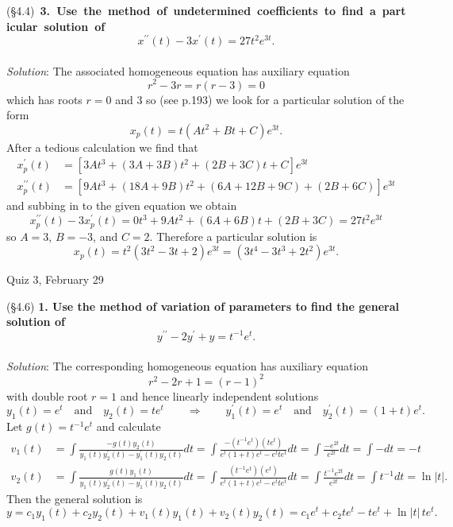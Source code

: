\documentclass[12pt]{article}
\begin{document}
\pagebreak
\noindent
\mbox{(\S 4.4) \textbf{3. Use the method of undetermined coefficients to find a particular solution of}}
$$x^{\prime\prime}(t) - 3x^\prime(t) = 27t^2e^{3t}.$$
~\\
\emph{Solution}: The associated homogeneous equation has auxiliary equation
$$r^2 - 3r = r(r-3) = 0$$
which has roots $r=0$ and $3$ so (see p.193) we look for a particular solution of the form 
$$x_p(t) = t(A t^2 + B t + C)e^{3t}.$$
After a tedious calculation we find that
$$\begin{aligned}
x_p^\prime (t) &= [3At^3 + (3A+3B)t^2 + (2B+3C)t + C]e^{3t} \\
x_p^{\prime\prime} (t) &= [9At^3 + (18A + 9B)t^2 + (6A+12B+9C) + (2B+6C)]e^{3t}
\end{aligned}$$
and subbing in to the given equation we obtain
$$x_p^{\prime\prime} (t) - 3x_p^\prime (t) = 0t^3 + 9At^2 + (6A+6B)t + (2B+3C) = 27t^2e^{3t}$$
so $A=3$, $B = -3$, and $C = 2$.  Therefore a particular solution is
$$x_p(t) = t^2(3t^2 - 3t + 2)e^{3t} = (3t^4 - 3t^3 + 2t^2)e^{3t}.$$
\pagebreak

\begin{center}
{\Large Quiz 3, February 29}
\end{center}
(\S 4.6) \textbf{1. Use the method of variation of parameters to find the general solution of}
$$y^{\prime\prime} - 2 y^\prime + y = t^{-1} e^t.$$
~\\
\emph{Solution}: The corresponding homogeneous equation has auxiliary equation
$$r^2 - 2r + 1 = (r-1)^2$$
with double root $r = 1$ and hence linearly independent solutions
$$y_1(t) = e^t \quad\text{and}\quad y_2(t) = te^t \qquad\Rightarrow\qquad y_1^\prime(t) = e^t \quad\text{and}\quad y_2^\prime(t) = (1+t)e^t.$$
Let $g(t) = t^{-1} e^t$ and calculate
$$\begin{aligned}
v_1(t)	&= \int \frac{-g(t)y_2(t)}{y_1(t)y_2^\prime(t) - y_1^\prime(t) y_2(t)} dt = \int \frac{-(t^{-1} e^t) (t e^t)}{e^t(1+t)e^t - e^t te^t}dt 
		 = \int \frac{-e^{2t}}{e^{2t}} dt = \int -dt = -t \\
v_2(t) 	&= \int \frac{g(t)y_1(t)}{y_1(t)y_2^\prime(t) - y_1^\prime(t) y_2(t)} dt = \int \frac{(t^{-1} e^t) (e^t)}{e^t(1+t)e^t - e^t te^t}dt 
		 = \int \frac{t^{-1} e^{2t}}{e^{2t}} dt = \int t^{-1} dt = \ln |t|.
\end{aligned}$$
Then the general solution is
$$y = c_1 y_1(t) + c_2 y_2(t) + v_1(t) y_1(t) + v_2(t) y_2(t) = c_1 e^t + c_2 t e^t - t e^t + \ln |t| \, t e^t.$$
\end{document}
